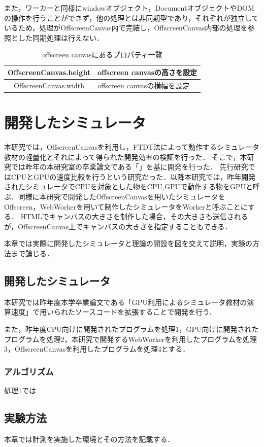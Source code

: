 \documentclass[a4j,12pt]{jsarticle}
\begin{document}
また，ワーカーと同様にwindowオブジェクト，DocumentオブジェクトやDOMの操作を行うことができず，他の処理とは非同期型であり，それぞれが独立しているため，処理がOffscreenCanvas内で完結し，OffscreenCanvas内部の処理を参照とした同期処理は行えない．

\begin{table} [h]
\centering
\caption{offscreen canvasにあるプロパティ一覧}
	\begin{tabular} {| c | l |} \hline
	OffscreenCanvas.height & offscreen canvasの高さを設定 \\ \hline
	OffscreenCanvas.width & offscreen canvasの横幅を設定 \\ \hline
	\end{tabular} 
	\label{tab:EC2018}
\end{table}
\newpage
\section{開発したシミュレータ}
本研究では，OffscreenCanvasを利用し，FTDT法によって動作するシミュレータ教材の軽量化とそれによって得られた開発効率の検証を行った．
そこで，本研究では昨年の本研究室の卒業論文である「」を基に開発を行った．
先行研究ではCPUとGPUの速度比較を行うという研究だった．以降本研究では，昨年開発されたシミュレータでCPUを対象とした物をCPU,GPUで動作する物をGPUと呼ぶ．同様に本研究で開発したOffscreenCanvasを用いたシミュレータをOffscreen，WebWorkerを用いて制作したシミュレータをWorkerと呼ぶことにする．
HTMLでキャンバスの大きさを制作した場合，その大きさも送信されるが，OffscreenCanvas上でキャンバスの大きさを指定することもできる．

本章では実際に開発したシミュレータと理論の開設を図を交えて説明，実験の方法まで論じる．
\subsection{開発したシミュレータ}
本研究では昨年度本学卒業論文である「GPU利用によるシミュレータ教材の演算速度」で用いられたソースコードを拡張することで開発を行う．

また，昨年度CPU向けに開発されたプログラムを処理1，GPU向けに開発されたプログラムを処理2，本研究で開発するWebWorkerを利用したプログラムを処理3，OffscreenCanvasを利用したプログラムを処理4とする．

\subsubsection{アルゴリズム}
処理1では
\subsection{実験方法}
本章では計測を実施した環境とその方法を記載する．
\end{document}

